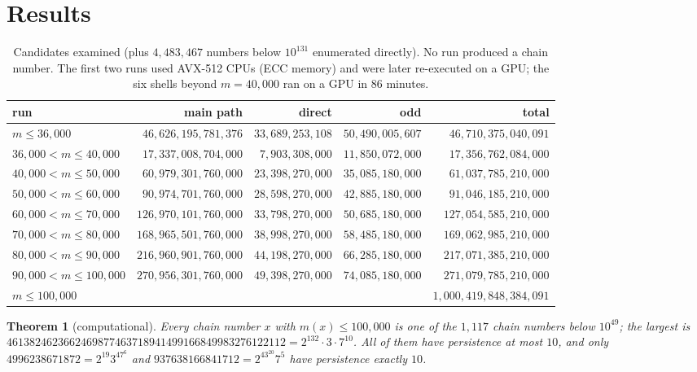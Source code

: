 \documentclass[11pt]{article}
\newtheorem{theorem}{Theorem}
\theoremstyle{definition}
\newcommand{\NB}{100{,}000}
\begin{document}
\section{Results}\label{sec:results}

\begin{table}[ht]
\centering\small
\begin{tabular}{lrrrr}
\toprule
run & main path & direct & odd & total \\
\midrule
$m\le 36{,}000$ & $46{,}626{,}195{,}781{,}376$ & $33{,}689{,}253{,}108$ & $50{,}490{,}005{,}607$ & $46{,}710{,}375{,}040{,}091$ \\
$36{,}000<m\le40{,}000$ & $17{,}337{,}008{,}704{,}000$ & $7{,}903{,}308{,}000$ & $11{,}850{,}072{,}000$ & $17{,}356{,}762{,}084{,}000$ \\
$40{,}000<m\le50{,}000$ & $60{,}979{,}301{,}760{,}000$ & $23{,}398{,}270{,}000$ & $35{,}085{,}180{,}000$ & $61{,}037{,}785{,}210{,}000$ \\
$50{,}000<m\le60{,}000$ & $90{,}974{,}701{,}760{,}000$ & $28{,}598{,}270{,}000$ & $42{,}885{,}180{,}000$ & $91{,}046{,}185{,}210{,}000$ \\
$60{,}000<m\le70{,}000$ & $126{,}970{,}101{,}760{,}000$ & $33{,}798{,}270{,}000$ & $50{,}685{,}180{,}000$ & $127{,}054{,}585{,}210{,}000$ \\
$70{,}000<m\le80{,}000$ & $168{,}965{,}501{,}760{,}000$ & $38{,}998{,}270{,}000$ & $58{,}485{,}180{,}000$ & $169{,}062{,}985{,}210{,}000$ \\
$80{,}000<m\le90{,}000$ & $216{,}960{,}901{,}760{,}000$ & $44{,}198{,}270{,}000$ & $66{,}285{,}180{,}000$ & $217{,}071{,}385{,}210{,}000$ \\
$90{,}000<m\le100{,}000$ & $270{,}956{,}301{,}760{,}000$ & $49{,}398{,}270{,}000$ & $74{,}085{,}180{,}000$ & $271{,}079{,}785{,}210{,}000$ \\
\midrule
$m\le 100{,}000$ & & & & $1{,}000{,}419{,}848{,}384{,}091$ \\
\bottomrule
\end{tabular}
\caption{Candidates examined (plus $4{,}483{,}467$ numbers below $10^{131}$ enumerated directly). No run produced a chain
number. The first two runs used AVX-512 CPUs (ECC memory) and were later re-executed on a GPU; the six shells beyond
$m=40{,}000$ ran on a GPU in $86$ minutes.}\label{tab:runs}
\end{table}

\begin{theorem}[computational]\label{thm:comp}
Every chain number $x$ with $m(x)\le\NB$ is one of the $1{,}117$ chain numbers below $10^{49}$; the largest is
$4613824623662469877463718941499166849983276122112=2^{132}\cdot3\cdot7^{10}$. All of them have persistence at most
$10$, and only $4996238671872=2^{19}3^47^6$ and $937638166841712=2^43^{20}7^5$ have persistence exactly $10$.
\end{theorem}
\end{document}
